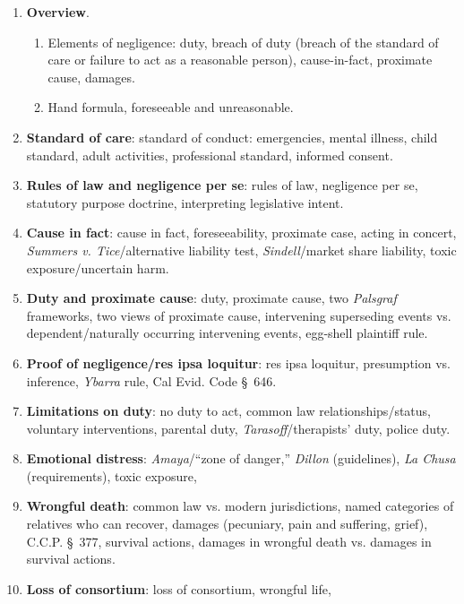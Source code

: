 \begin{enumerate}
    \item \textbf{Overview}.
    \begin{enumerate}
        \item Elements of negligence: duty, breach of duty (breach of the 
        standard of care or failure to act as a reasonable person), 
        cause-in-fact, proximate cause, damages. 
        \item Hand formula, foreseeable and unreasonable.
    \end{enumerate}
    \item \textbf{Standard of care}: standard of conduct: emergencies, mental 
    illness, child standard, adult activities, professional standard, informed 
    consent.
    \item \textbf{Rules of law and negligence per se}: rules of law, 
    negligence per se, statutory purpose doctrine, interpreting legislative 
    intent.
    \item \textbf{Cause in fact}: cause in fact, foreseeability, proximate 
    case, acting in concert, \emph{Summers v. Tice}/alternative liability 
    test, \emph{Sindell}/market share liability, toxic exposure/uncertain 
    harm.
    \item \textbf{Duty and proximate cause}: duty, proximate cause, two 
    \emph{Palsgraf} frameworks, two views of proximate cause, intervening 
    superseding events vs. dependent/naturally occurring intervening events, 
    egg-shell plaintiff rule.
    \item \textbf{Proof of negligence/res ipsa loquitur}: res ipsa loquitur, 
    presumption vs. inference, \emph{Ybarra} rule, Cal Evid. Code \S\ 646.  
    \item \textbf{Limitations on duty}: no duty to act, common law 
    relationships/status, voluntary interventions, parental duty, 
    \emph{Tarasoff}/therapists' duty, police duty.
    \item \textbf{Emotional distress}: \emph{Amaya}/``zone of danger,'' 
    \emph{Dillon} (guidelines), \emph{La Chusa} (requirements), toxic 
    exposure,
    \item \textbf{Wrongful death}: common law vs. modern jurisdictions, named 
    categories of relatives who can recover, damages 
    (pecuniary, pain and suffering, grief), C.C.P. \S\ 377, survival actions, 
    damages in wrongful death vs. damages in survival actions.
    \item \textbf{Loss of consortium}: loss of consortium, wrongful life, 

\end{enumerate}
